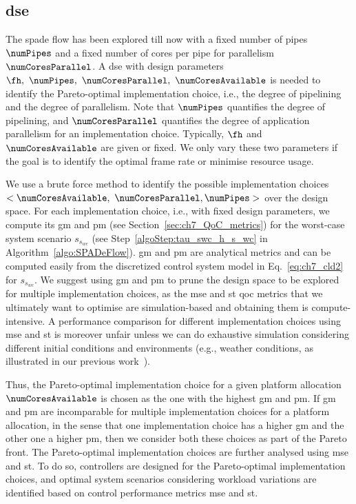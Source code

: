 \subsection{\texorpdfstring{\Acrfull{dse}}{Design space exploration (DSE)}}
\label{sec:ch7_DSE}
The \gls{spade} flow has been explored till now with a fixed number of pipes $\numPipes$ and a fixed number of cores per pipe for parallelism $\numCoresParallel$.
A \gls{dse} with design parameters $\fh,\ \numPipes,\ \numCoresParallel,\ \numCoresAvailable$ is needed to identify the Pareto-optimal implementation choice, i.e., the degree of pipelining and the degree of parallelism.
Note that $\numPipes$ quantifies the degree of pipelining, and $\numCoresParallel$ quantifies the degree of application parallelism for an implementation choice.
Typically, $\fh$ and $\numCoresAvailable$ are given or fixed. We only vary these two parameters if the goal is to identify the optimal frame rate or minimise resource usage.

We use a brute force method to identify the possible implementation choices $<\numCoresAvailable,\ \numCoresParallel, \numPipes>$ over the design space. For each implementation choice, i.e., with fixed design parameters, we compute its \gls{gm} and \gls{pm} (see Section~\ref{sec:ch7_QoC_metrics}) for the worst-case system scenario $s_{s_{wc}}$ (see Step~\ref{algoStep:tau_swc_h_s_wc} in Algorithm~\ref{algo:SPADeFlow}).
\gls{gm} and \gls{pm} are analytical metrics and can be computed easily from the discretized control system model in Eq.~\ref{eq:ch7_cld2} for $s_{s_{wc}}$.
We suggest using \gls{gm} and \gls{pm} to prune the design space to be explored for multiple implementation choices, as the \gls{mse} and \gls{st} \gls{qoc} metrics that we ultimately want to optimise are simulation-based and obtaining them is compute-intensive.
A performance comparison for different implementation choices using \gls{mse} and \gls{st} is moreover unfair unless we can do exhaustive simulation considering different initial conditions and environments (e.g., weather conditions, as illustrated in our previous work~\cite{de2020access}).

Thus, the Pareto-optimal implementation choice for a given platform allocation $\numCoresAvailable$ is chosen as the one with the highest \gls{gm} and \gls{pm}.
If \gls{gm} and \gls{pm} are incomparable for multiple implementation choices for a platform allocation, in the sense that one implementation choice has a higher \gls{gm} and the other one a higher \gls{pm}, then we consider both these choices as part of the Pareto front. The Pareto-optimal implementation choices are further analysed using \gls{mse} and \gls{st}.
To do so, controllers are designed for the Pareto-optimal implementation choices, and optimal system scenarios considering workload variations are identified based on control performance metrics \gls{mse} and \gls{st}.

